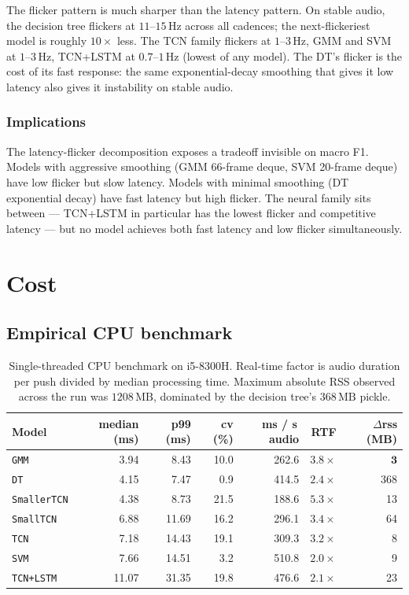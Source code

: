 The flicker pattern is much sharper than the latency pattern.
On stable audio, the decision tree flickers at $11$--$15\,\text{Hz}$ across all cadences; the next-flickeriest model is roughly $10\times$ less.
The TCN family flickers at $1$--$3\,\text{Hz}$, GMM and SVM at $1$--$3\,\text{Hz}$, TCN+LSTM at $0.7$--$1\,\text{Hz}$ (lowest of any model).
The DT's flicker is the cost of its fast response: the same exponential-decay smoothing that gives it low latency also gives it instability on stable audio.

\subsubsection*{Implications}

The latency-flicker decomposition exposes a tradeoff invisible on macro F1.
Models with aggressive smoothing (GMM 66-frame deque, SVM 20-frame deque) have low flicker but slow latency.
Models with minimal smoothing (DT exponential decay) have fast latency but high flicker.
The neural family sits between — TCN+LSTM in particular has the lowest flicker and competitive latency — but no model achieves both fast latency and low flicker simultaneously.

\section{Cost}
\label{sec:exp_cost}

\subsection{Empirical CPU benchmark}
\label{sec:exp_complexity_results}

\begin{table}[h]
\centering
\small
\begin{tabular}{lrrrrrr}
\toprule
\textbf{Model} & \textbf{median (ms)} & \textbf{p99 (ms)} & \textbf{cv (\%)} & \textbf{ms / s\,audio} & \textbf{RTF} & \textbf{$\Delta$rss (MB)} \\
\midrule
\texttt{GMM}        & 3.94 & 8.43  & 10.0 & 262.6 & $3.8\times$ & $\mathbf{3}$ \\
\texttt{DT}         & 4.15 & 7.47  & 0.9  & 414.5 & $2.4\times$ & 368 \\
\texttt{SmallerTCN} & 4.38 & 8.73  & 21.5 & 188.6 & $\mathbf{5.3\times}$ & 13 \\
\texttt{SmallTCN}   & 6.88 & 11.69 & 16.2 & 296.1 & $3.4\times$ & 64 \\
\texttt{TCN}        & 7.18 & 14.43 & 19.1 & 309.3 & $3.2\times$ & 8 \\
\texttt{SVM}        & 7.66 & 14.51 & 3.2  & 510.8 & $2.0\times$ & 9 \\
\texttt{TCN+LSTM}   & 11.07 & 31.35 & 19.8 & 476.6 & $2.1\times$ & 23 \\
\bottomrule
\end{tabular}
\caption{Single-threaded CPU benchmark on i5-8300H. Real-time factor is audio duration per push divided by median processing time. Maximum absolute RSS observed across the run was $1208\,\text{MB}$, dominated by the decision tree's $368\,\text{MB}$ pickle.}
\label{tab:complexity_t1_results}
\end{table}

